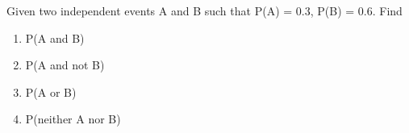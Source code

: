 \begin{flushleft}
Given two independent events A and B such
that P(A) = 0.3, P(B) = 0.6. Find
\begin{enumerate}
\item P(A and B)
\item P(A and not B)
\item P(A or B)
\item P(neither A nor B)
\end{enumerate}
\end{flushleft}
